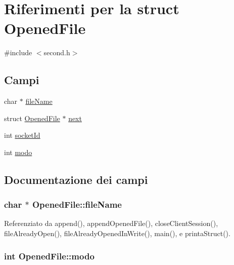 \hypertarget{structOpenedFile}{}\section{Riferimenti per la struct Opened\+File}
\label{structOpenedFile}


{\ttfamily \#include $<$second.\+h$>$}

\subsection*{Campi}
\begin{DoxyCompactItemize}
\item 
char $\ast$ \hyperlink{structOpenedFile_abcff0610dfa8b1e3836b3f5bac40c8f5}{file\+Name}
\item 
struct \hyperlink{structOpenedFile}{Opened\+File} $\ast$ \hyperlink{structOpenedFile_a9b8c8b995cdda6da249a6ce9a9df98b2}{next}
\item 
int \hyperlink{structOpenedFile_a2af35018ecff06dbd349d464c815038a}{socket\+Id}
\item 
int \hyperlink{structOpenedFile_a6d9f22ff6ba81506ba9c4a60f27c4f32}{modo}
\end{DoxyCompactItemize}


\subsection{Documentazione dei campi}
\hypertarget{structOpenedFile_abcff0610dfa8b1e3836b3f5bac40c8f5}{}
\subsubsection[{file\+Name}]{\setlength{\rightskip}{0pt plus 5cm}char $\ast$ Opened\+File\+::file\+Name}\label{structOpenedFile_abcff0610dfa8b1e3836b3f5bac40c8f5}


Referenziato da append(), append\+Opened\+File(), close\+Client\+Session(), file\+Already\+Open(), file\+Already\+Opened\+In\+Write(), main(), e printa\+Struct().

\hypertarget{structOpenedFile_a6d9f22ff6ba81506ba9c4a60f27c4f32}{}
\subsubsection[{modo}]{\setlength{\rightskip}{0pt plus 5cm}int Opened\+File\+::modo}\label{structOpenedFile_a6d9f22ff6ba81506ba9c4a60f27c4f32}


